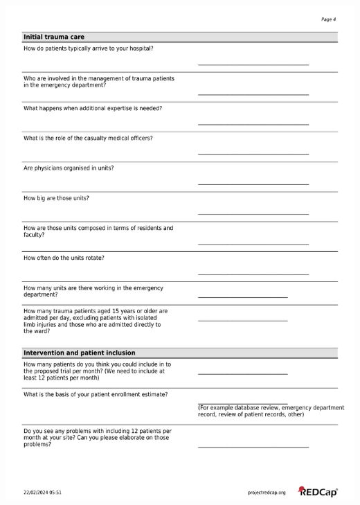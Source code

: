 \documentclass[
]{scrartcl}
\begin{document}
\includegraphics{./appendices/hospital-screening-interview-instrument/hospital-screening-interview-4.pdf}
\end{document}
